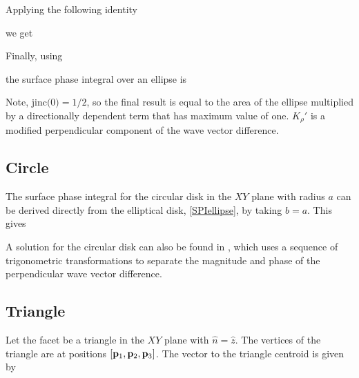 Applying the following identity

we get

Finally, using

the surface phase integral over an ellipse is

Note, $\textrm{jinc(0)} = 1/2$, so the final result is equal to the area of the ellipse multiplied by a directionally dependent term that has maximum value of one. $K_{\rho}'$ is a modified perpendicular component of the wave vector difference.  


\subsection{Circle}

The surface phase integral for the circular disk in the $XY$ plane with radius $a$ can be derived directly from the elliptical disk, \eqref{SPIellipse}, by taking $b = a$.  This gives

A solution for the circular disk can also be found in \cite{trott1988disk}, which uses a sequence of trigonometric transformations to separate the magnitude and phase of the perpendicular wave vector difference. %

\subsection{Triangle}

Let the facet be a triangle in the $XY$ plane with $\hat{n} = \hat{z}$. The vertices of the triangle are at positions $[\mathbf{p}_1, \mathbf{p}_2, \mathbf{p}_3]$. The vector to the triangle centroid is given by 

